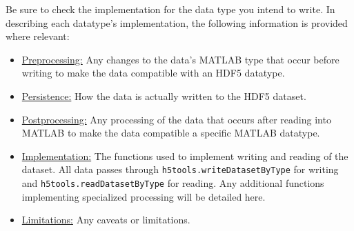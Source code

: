 \documentclass[11pt]{exam}
\newcommand\myfcn[1]{\colorbox{codegray}{\textcolor{codeblue}{\texttt{#1}}}}
\begin{document}
		$\quad$\\
        \noindent Be sure to check the implementation for the data type you intend to write. In describing each datatype's implementation, the following information is provided where relevant:
        \begin{itemize}
            \item \underline{Preprocessing:} Any changes to the data's MATLAB type that occur before writing to make the data compatible with an HDF5 datatype.
            \item \underline{Persistence:} How the data is actually written to the HDF5 dataset.
            \item \underline{Postprocessing:} Any processing of the data that occurs after reading into MATLAB to make the data compatible a specific MATLAB datatype.
            \item \underline{Implementation:} The functions used to implement writing and reading of the dataset. All data passes through \myfcn{h5tools.writeDatasetByType} for writing and \myfcn{h5tools.readDatasetByType} for reading. Any additional functions implementing specialized processing will be detailed here. 
			\item \underline{Limitations:} Any caveats or limitations.
        \end{itemize}
\end{document}
